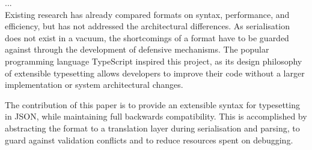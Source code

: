 \documentclass[../report.tex]{subfiles}
\begin{document}
... \\

Existing research has already compared formats on syntax, performance, and efficiency, but has not addressed the architectural differences. As serialisation does not exist in a vacuum, the shortcomings of a format have to be guarded against through the development of defensive mechanisms. The popular programming language TypeScript inspired this project, as its design philosophy of extensible typesetting allows developers to improve their code without a larger implementation or system architectural changes.

The contribution of this paper is to provide an extensible syntax for typesetting in JSON, while maintaining full backwards compatibility. This is accomplished by abstracting the format to a translation layer during serialisation and parsing, to guard against validation conflicts and to reduce resources spent on debugging.







\end{document}
